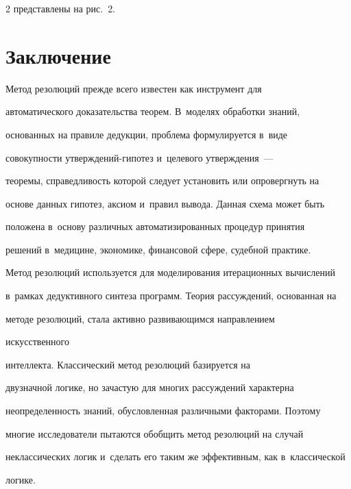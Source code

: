 \begin{multicols}{2}
представлены на рис.~2.








\section{Заключение}







  


  Метод резолюций прежде всего известен как инструмент для 


автоматического доказательства теорем. В~моделях обработки знаний, 


основанных на правиле дедукции, проблема формулируется в~виде 


совокупности утверж\-де\-ний-ги\-по\-тез и~целевого утверж\-де\-ния~---  


тео\-ре\-мы, справедливость которой следует установить или опровергнуть на 


основе данных гипотез, аксиом и~правил вывода. Данная схема может быть 


положена в~основу различных автоматизированных процедур принятия 


решений в~медицине, экономике, финансовой сфере, судебной практике. 


Метод резолюций используется для моделирования итерационных вычислений 


в~рамках дедуктивного синтеза программ. Теория рассуждений, основанная на 


методе резолюций, стала активно развивающимся направлением 


искусственного\linebreak


 интеллекта. Классический метод резолюций базируется на 


двузначной логике, но зачастую для многих рассуждений характерна 


неопределенность знаний, обусловленная различными факторами. \mbox{Поэтому} 


многие исследователи пытаются обобщить метод резолюций на случай 


неклассических логик и~сделать его таким же эффективным, как в~классической 


логике. 



\end{multicols}
